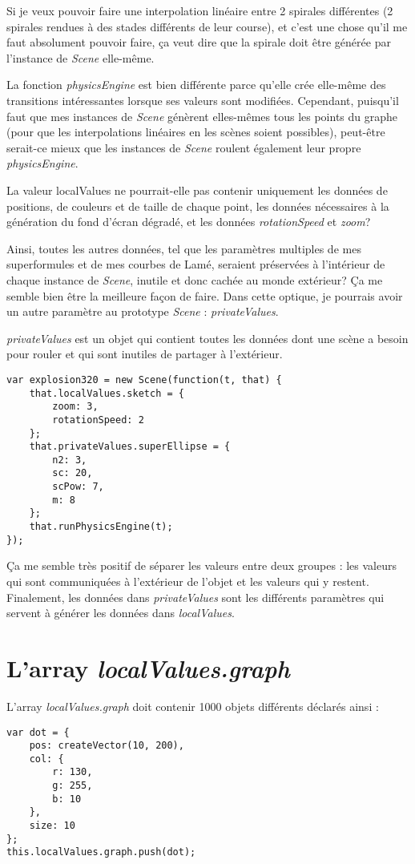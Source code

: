 Si je veux pouvoir faire une interpolation linéaire entre 2 spirales différentes (2 spirales rendues à des stades différents de leur course), et c'est une chose qu'il me faut absolument pouvoir faire, ça veut dire que la spirale doit être générée par l'instance de \textit{Scene} elle-même.

La fonction \textit{physicsEngine} est bien différente parce qu'elle crée elle-même des transitions intéressantes lorsque ses valeurs sont modifiées. Cependant, puisqu'il faut que mes instances de \textit{Scene} génèrent elles-mêmes tous les points du graphe (pour que les interpolations linéaires en les scènes soient possibles), peut-être serait-ce mieux que les instances de \textit{Scene} roulent également leur propre \textit{physicsEngine}.

La valeur localValues ne pourrait-elle pas contenir uniquement les données de positions, de couleurs et de taille de chaque point, les données nécessaires à la génération du fond d'écran dégradé, et les données \textit{rotationSpeed} et \textit{zoom}?

Ainsi, toutes les autres données, tel que les paramètres multiples de mes superformules et de mes courbes de Lamé, seraient préservées à l'intérieur de chaque instance de \textit{Scene}, inutile et donc cachée au monde extérieur? Ça me semble bien être la meilleure façon de faire. Dans cette optique, je pourrais avoir un autre paramètre au prototype \textit{Scene} : \textit{privateValues}.

\textit{privateValues} est un objet qui contient toutes les données dont une scène a besoin pour rouler et qui sont inutiles de partager à l'extérieur.

\begin{lstlisting}
var explosion320 = new Scene(function(t, that) {
    that.localValues.sketch = {
        zoom: 3,
        rotationSpeed: 2
    };
    that.privateValues.superEllipse = {
        n2: 3,
        sc: 20,
        scPow: 7,
        m: 8
    };
    that.runPhysicsEngine(t);
});
\end{lstlisting}

Ça me semble très positif de séparer les valeurs entre deux groupes : les valeurs qui sont communiquées à l'extérieur de l'objet et les valeurs qui y restent. Finalement, les données dans \textit{privateValues} sont les différents paramètres qui servent à générer les données dans \textit{localValues}.

\section{L'array \textit{localValues.graph}}
L'array \textit{localValues.graph} doit contenir 1000 objets différents déclarés ainsi :
\begin{lstlisting}
var dot = {
    pos: createVector(10, 200),
    col: {
        r: 130,
        g: 255,
        b: 10
    },
    size: 10
};
this.localValues.graph.push(dot);
\end{lstlisting}

